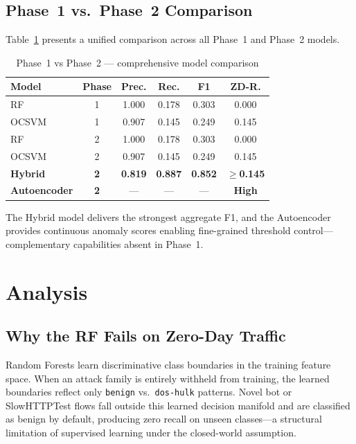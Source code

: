 \documentclass[10pt,conference]{IEEEtran}
\begin{document}
\subsection{Phase~1 vs.\ Phase~2 Comparison}

Table~\ref{tab:comparison} presents a unified comparison across all
Phase~1 and Phase~2 models.

\begin{table}[H]
\centering
\caption{Phase~1 vs Phase~2 — comprehensive model comparison}
\label{tab:comparison}
\begin{tabular}{lccccc}
\toprule
\textbf{Model} & \textbf{Phase} & \textbf{Prec.} & \textbf{Rec.} & \textbf{F1} & \textbf{ZD-R.} \\
\midrule
RF        & 1 & 1.000 & 0.178 & 0.303 & 0.000 \\
OCSVM     & 1 & 0.907 & 0.145 & 0.249 & 0.145 \\
RF        & 2 & 1.000 & 0.178 & 0.303 & 0.000 \\
OCSVM     & 2 & 0.907 & 0.145 & 0.249 & 0.145 \\
\textbf{Hybrid} & \textbf{2} & \textbf{0.819} & \textbf{0.887} & \textbf{0.852} & $\mathbf{\geq}$\textbf{0.145} \\
\textbf{Autoencoder} & \textbf{2} & --- & --- & --- & \textbf{High} \\
\bottomrule
\end{tabular}
\end{table}

The Hybrid model delivers the strongest aggregate F1, and the
Autoencoder provides continuous anomaly scores enabling fine-grained
threshold control—complementary capabilities absent in Phase~1.

\section{Analysis}
\label{sec:analysis}

\subsection{Why the RF Fails on Zero-Day Traffic}

Random Forests learn discriminative class boundaries in the training
feature space. When an attack family is entirely withheld from
training, the learned boundaries reflect only \texttt{benign}
vs.\ \texttt{dos-hulk} patterns. Novel bot or SlowHTTPTest flows
fall outside this learned decision manifold and are classified as
benign by default, producing zero recall on unseen classes—a
structural limitation of supervised learning under the closed-world
assumption.
\end{document}
